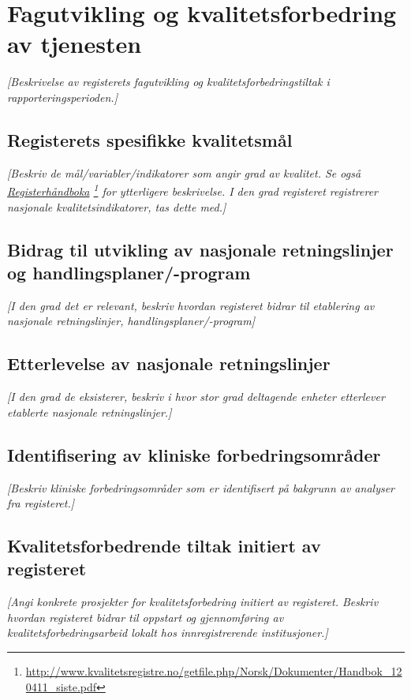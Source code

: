 \documentclass[norsk, a4paper, twocolumn]{report}
\newcommand{\guide}[1] {
	\textit{[\textcolor{guidegray}{#1}]}
	}
\begin{document}
\chapter{Fagutvikling og kvalitetsforbedring av tjenesten}\label{cha:fag}
\guide{Beskrivelse av registerets fagutvikling og kvalitetsforbedringstiltak
i rapporteringsperioden.}

\section{Registerets spesifikke kvalitetsmål}\label{sec:regspe}
\guide{Beskriv de mål/variabler/indikatorer som angir grad av kvalitet.
Se også
\href{http://www.kvalitetsregistre.no/getfile.php/Norsk/Dokumenter/Handbok_120411_siste.pdf}{Registerhåndboka}
\footnote{\url{http://www.kvalitetsregistre.no/getfile.php/Norsk/Dokumenter/Handbok_120411_siste.pdf}}
for ytterligere beskrivelse. I den grad registeret registrerer nasjonale
kvalitetsindikatorer, tas dette med.}





\section{Bidrag til utvikling av nasjonale retningslinjer og handlingsplaner/-program}\label{sec:retut}
\guide{I den grad det er relevant, beskriv hvordan registeret bidrar til
etablering av nasjonale retningslinjer, handlingsplaner/-program}

\section{Etterlevelse av nasjonale retningslinjer}\label{sec:retbru}
\guide{I den grad de eksisterer, beskriv i hvor stor grad deltagende enheter
etterlever etablerte nasjonale retningslinjer.}

\section{Identifisering av kliniske forbedringsområder}\label{sec:ide}
\guide{Beskriv kliniske forbedringsområder som er identifisert på bakgrunn
av analyser fra registeret.}

\section{Kvalitetsforbedrende tiltak initiert av registeret}\label{sec:brures}
\guide{Angi konkrete prosjekter
for kvalitetsforbedring initiert av registeret. Beskriv
hvordan registeret bidrar til oppstart og gjennomføring
av kvalitetsforbedringsarbeid lokalt hos innregistrerende institusjoner.}
\end{document}
